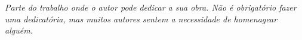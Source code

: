 \begin{dedicatoria}
   \vspace*{\fill}
   \centering
   \noindent
   \textit{Parte do trabalho onde o autor pode dedicar a sua obra. Não é obrigatório fazer uma dedicatória, mas muitos autores sentem a necessidade de homenagear alguém. } \vspace*{\fill}
\end{dedicatoria}